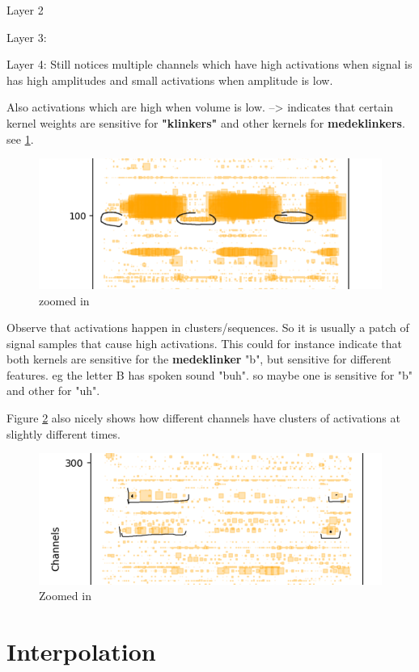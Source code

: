 \begin{appendices}
	Layer 2
	
	Layer 3:
	
	Layer 4:
	Still notices multiple channels which have high activations when signal is has high amplitudes and small activations when amplitude is low. 
	
	Also activations which are high when volume is low. --> indicates that certain kernel weights are sensitive for \textbf{"klinkers"} and other kernels for \textbf{medeklinkers}. see \ref{fig:screenshot008}.
	
	\begin{figure}[h]
		\centering
		\includegraphics[width=0.7\linewidth]{screenshot008}
		\caption{zoomed in}
		\label{fig:screenshot008}
	\end{figure}
	
	
	Observe that activations happen in clusters/sequences. So it is usually a patch of signal samples that cause high activations. This could for instance indicate that both kernels are sensitive for the \textbf{medeklinker} "b", but sensitive for different features. eg the letter B has spoken sound "buh". so maybe one is sensitive for "b" and other for "uh".
	
	Figure \ref{fig:layer4 zoomed in} also nicely shows how different channels have clusters of activations at slightly different times. 
	
	\begin{figure}[h]
		\centering
		\includegraphics[width=0.7\linewidth]{screenshot010}
		\caption{Zoomed in}
		\label{fig:layer4 zoomed in}
	\end{figure}
	
	
	\chapter{Interpolation}
	
	
	
		
	


\end{appendices}